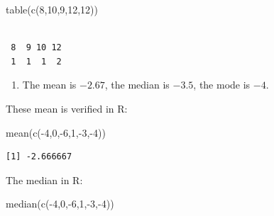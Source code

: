 \documentclass[
  letterpaper,
  DIV=11,
  numbers=noendperiod]{scrreprt}
\newenvironment{Shaded}{\begin{snugshade}}{\end{snugshade}}
\newcommand{\DecValTok}[1]{\textcolor[rgb]{0.68,0.00,0.00}{#1}}
\newcommand{\FunctionTok}[1]{\textcolor[rgb]{0.28,0.35,0.67}{#1}}
\newcommand{\NormalTok}[1]{\textcolor[rgb]{0.00,0.23,0.31}{#1}}
\newcommand{\SpecialCharTok}[1]{\textcolor[rgb]{0.37,0.37,0.37}{#1}}
\providecommand{\tightlist}{%
  \setlength{\itemsep}{0pt}\setlength{\parskip}{0pt}}\usepackage{longtable,booktabs,array}
\begin{document}
\begin{Shaded}
\begin{Highlighting}[numbers=left,,]
\FunctionTok{table}\NormalTok{(}\FunctionTok{c}\NormalTok{(}\DecValTok{8}\NormalTok{,}\DecValTok{10}\NormalTok{,}\DecValTok{9}\NormalTok{,}\DecValTok{12}\NormalTok{,}\DecValTok{12}\NormalTok{))}
\end{Highlighting}
\end{Shaded}

\begin{verbatim}

 8  9 10 12 
 1  1  1  2 
\end{verbatim}

\begin{blackbox}

\begin{enumerate}
\def\labelenumi{\arabic{enumi}.}
\setcounter{enumi}{1}
\tightlist
\item
  The mean is \(-2.67\), the median is \(-3.5\), the mode is \(-4\).
\end{enumerate}

\end{blackbox}

These mean is verified in R:

\begin{Shaded}
\begin{Highlighting}[numbers=left,,]
\FunctionTok{mean}\NormalTok{(}\FunctionTok{c}\NormalTok{(}\SpecialCharTok{{-}}\DecValTok{4}\NormalTok{,}\DecValTok{0}\NormalTok{,}\SpecialCharTok{{-}}\DecValTok{6}\NormalTok{,}\DecValTok{1}\NormalTok{,}\SpecialCharTok{{-}}\DecValTok{3}\NormalTok{,}\SpecialCharTok{{-}}\DecValTok{4}\NormalTok{))}
\end{Highlighting}
\end{Shaded}

\begin{verbatim}
[1] -2.666667
\end{verbatim}

The median in R:

\begin{Shaded}
\begin{Highlighting}[numbers=left,,]
\FunctionTok{median}\NormalTok{(}\FunctionTok{c}\NormalTok{(}\SpecialCharTok{{-}}\DecValTok{4}\NormalTok{,}\DecValTok{0}\NormalTok{,}\SpecialCharTok{{-}}\DecValTok{6}\NormalTok{,}\DecValTok{1}\NormalTok{,}\SpecialCharTok{{-}}\DecValTok{3}\NormalTok{,}\SpecialCharTok{{-}}\DecValTok{4}\NormalTok{))}
\end{Highlighting}
\end{Shaded}
\end{document}
